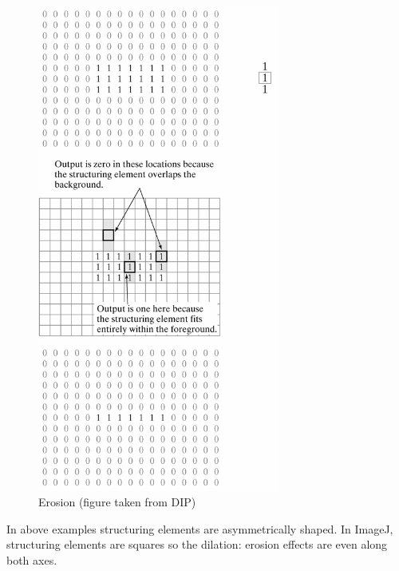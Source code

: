 \begin{figure}[htbp]
\begin{center}
\includegraphics[width=8cm]{img/CMCIBasicCourse201102-img66.png}
\caption{ Erosion (figure taken from DIP)}
\label{fig:img66}
\end{center}
\end{figure}

In above examples structuring elements are asymmetrically shaped. In
ImageJ, structuring elements are squares so the dilation: erosion
effects are even along both axes. 

